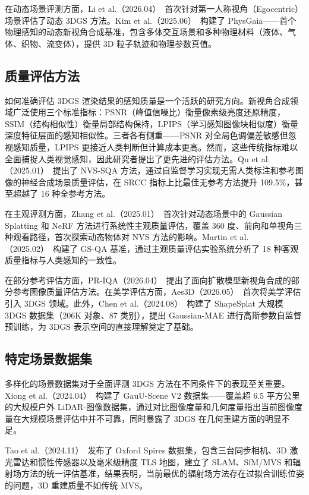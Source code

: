 在动态场景评测方面，Li et al.（2026.04）~\cite{2604_23803}首次针对第一人称视角（Egocentric）场景评估了动态 3DGS 方法。Kim et al.（2025.06）~\cite{2506_02794}构建了 PhysGaia——首个物理感知的动态新视角合成基准，包含多体交互场景和多种物理材料（液体、气体、织物、流变体），提供 3D 粒子轨迹和物理参数真值。

\subsection{质量评估方法}

如何准确评估 3DGS 渲染结果的感知质量是一个活跃的研究方向。新视角合成领域广泛使用三个标准指标：PSNR（峰值信噪比）衡量像素级亮度还原精度，SSIM（结构相似性）衡量局部结构保持，LPIPS（学习感知图像块相似度）衡量深度特征层面的感知相似性。三者各有侧重——PSNR 对全局色调偏差敏感但忽视感知质量，LPIPS 更接近人类判断但计算成本更高。然而，这些传统指标难以全面捕捉人类视觉感知，因此研究者提出了更先进的评估方法。Qu et al.（2025.01）~\cite{2501_06488}提出了 NVS-SQA 方法，通过自监督学习实现无需人类标注和参考图像的神经合成场景质量评估，在 SRCC 指标上比最佳无参考方法提升 109.5\%，甚至超越了 16 种全参考方法。

在主观评测方面，Zhang et al.（2025.01）~\cite{2501_08072}首次针对动态场景中的 Gaussian Splatting 和 NeRF 方法进行系统性主观质量评估，覆盖 360 度、前向和单视角三种观看路径，首次探索动态物体对 NVS 方法的影响。Martin et al.（2025.02）~\cite{2502_13196}构建了 GS-QA 基准，通过主观质量评估实验系统分析了 18 种客观质量指标与人类感知的一致性。

在部分参考评估方面，PR-IQA（2026.04）~\cite{2604_04576}提出了面向扩散模型新视角合成的部分参考图像质量评估方法。在美学评估方面，Aes3D（2026.05）~\cite{2605_05155}首次将美学评估引入 3DGS 领域。此外，Chen et al.（2024.08）~\cite{2408_10906}构建了 ShapeSplat 大规模 3DGS 数据集（206K 对象、87 类别），提出 Gaussian-MAE 进行高斯参数自监督预训练，为 3DGS 表示空间的直接理解奠定了基础。

\subsection{特定场景数据集}

多样化的场景数据集对于全面评测 3DGS 方法在不同条件下的表现至关重要。Xiong et al.（2024.04）~\cite{2404_04880}构建了 GauU-Scene V2 数据集——覆盖超 6.5 平方公里的大规模户外 LiDAR-图像数据集，通过对比图像度量和几何度量指出当前图像度量在大规模场景评估中并不可靠，同时暴露了 3DGS 在几何重建方面的明显不足。

Tao et al.（2024.11）~\cite{2411_10546}发布了 Oxford Spires 数据集，包含三台同步相机、3D 激光雷达和惯性传感器以及毫米级精度 TLS 地图，建立了 SLAM、SfM/MVS 和辐射场方法的统一评估基准，结果表明，当前最优的辐射场方法存在过拟合训练位姿的问题，3D 重建质量不如传统 MVS。

